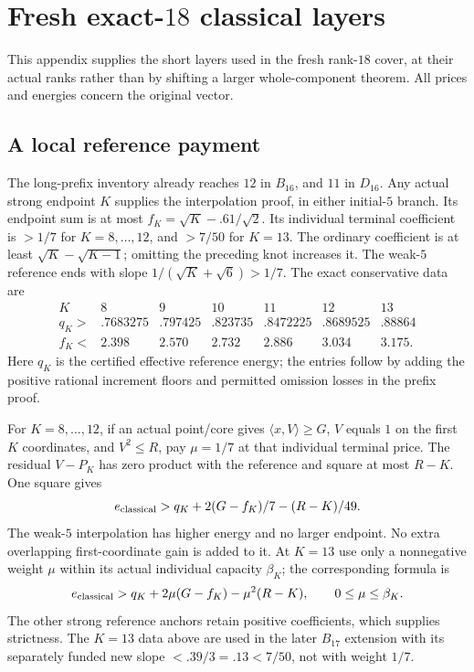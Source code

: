 \documentclass[11pt]{article}
\theoremstyle{definition}
\theoremstyle{remark}
\newcommand{\ip}[2]{\langle #1,#2\rangle}
\begin{document}
\section{Fresh exact-\(18\) classical layers}
\label{app:exact18layers}
This appendix supplies the short layers used in the
fresh rank-\(18\) cover, at their actual ranks rather
than by shifting a larger whole-component theorem.
All prices and energies concern the original vector.

\subsection{A local reference payment}
The long-prefix inventory already reaches \(12\)
in \(B_{16}\), and \(11\) in \(D_{16}\).
Any actual strong endpoint \(K\) supplies the
interpolation proof, in either initial-\(5\) branch.
Its endpoint sum is at most
\(f_K=\sqrt K-.61/\sqrt2\).
Its individual terminal coefficient is \(>1/7\)
for \(K=8,\ldots,12\), and \(>7/50\) for \(K=13\).
The ordinary coefficient is at least
\(\sqrt K-\sqrt{K-1}\); omitting the preceding
knot increases it. The weak-\(5\) reference
ends with slope \(1/(\sqrt K+\sqrt6)>1/7\).
The exact conservative data are
\[
\begin{array}{c|rrrrrr}
K&8&9&10&11&12&13\\ \hline
q_K>&.7683275&.797425&.823735&.8472225&.8689525&.88864\\
f_K<&2.398&2.570&2.732&2.886&3.034&3.175.
\end{array}
\]
Here \(q_K\) is the certified effective reference
energy; the entries follow by adding the positive
rational increment floors and permitted omission
losses in the prefix proof.

For \(K=8,\ldots,12\), if an actual point/core gives
\(\ip{x}{V}\geq G\),
\(V\) equals \(1\) on the first \(K\) coordinates,
and \(V^2\leq R\), pay \(\mu=1/7\) at that
individual terminal price. The residual \(V-P_K\)
has zero product with the reference and square
at most \(R-K\). One square gives
\begin{equation}\label{app:eq:localpayment}
 e_{\rm classical}>
 q_K+2(G-f_K)/7-(R-K)/49.
\end{equation}
The weak-\(5\) interpolation has higher energy
and no larger endpoint. No extra overlapping
first-coordinate gain is added to it.
At \(K=13\) use only a nonnegative weight \(\mu\)
within its actual individual capacity \(\beta_K\); the corresponding
formula is
\[
 e_{\rm classical}>
 q_K+2\mu(G-f_K)-\mu^2(R-K),\qquad 0\leq\mu\leq\beta_K.
\]
The other strong reference anchors retain positive coefficients,
which supplies strictness. The \(K=13\) data above are used in
the later \(B_{17}\) extension with its separately funded new
slope \(<.39/3=.13<7/50\), not with weight \(1/7\).
\end{document}
